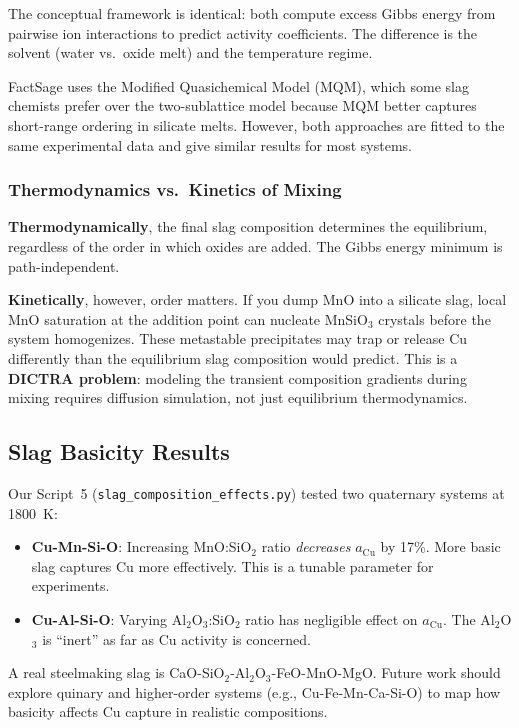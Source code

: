 \documentclass[11pt]{article}
\begin{document}
The conceptual framework is identical: both compute excess Gibbs energy from pairwise ion interactions to predict activity coefficients. The difference is the solvent (water vs.\ oxide melt) and the temperature regime.

FactSage uses the Modified Quasichemical Model (MQM), which some slag chemists prefer over the two-sublattice model because MQM better captures short-range ordering in silicate melts. However, both approaches are fitted to the same experimental data and give similar results for most systems.

\subsubsection{Thermodynamics vs.\ Kinetics of Mixing}

\textbf{Thermodynamically}, the final slag composition determines the equilibrium, regardless of the order in which oxides are added. The Gibbs energy minimum is path-independent.

\textbf{Kinetically}, however, order matters. If you dump MnO into a silicate slag, local MnO saturation at the addition point can nucleate MnSiO$_3$ crystals before the system homogenizes. These metastable precipitates may trap or release Cu differently than the equilibrium slag composition would predict. This is a \textbf{DICTRA problem}: modeling the transient composition gradients during mixing requires diffusion simulation, not just equilibrium thermodynamics.

\subsection{Slag Basicity Results}

Our Script~5 (\texttt{slag\_composition\_effects.py}) tested two quaternary systems at \SI{1800}{\kelvin}:

\begin{itemize}[leftmargin=*]
    \item \textbf{Cu-Mn-Si-O}: Increasing MnO:SiO$_2$ ratio \textit{decreases} $a_{\text{Cu}}$ by 17\%. More basic slag captures Cu more effectively. This is a tunable parameter for experiments.
    \item \textbf{Cu-Al-Si-O}: Varying Al$_2$O$_3$:SiO$_2$ ratio has negligible effect on $a_{\text{Cu}}$. The Al$_2$O$_3$ is ``inert'' as far as Cu activity is concerned.
\end{itemize}

A real steelmaking slag is CaO-SiO$_2$-Al$_2$O$_3$-FeO-MnO-MgO. Future work should explore quinary and higher-order systems (e.g., Cu-Fe-Mn-Ca-Si-O) to map how basicity affects Cu capture in realistic compositions.
\end{document}
